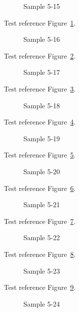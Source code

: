 \begin{figure}[tbhp]
\caption{Sample 5-15}
\label{fig:sample-5-15}
\end{figure}

Test reference Figure~\ref{fig:sample-5-15}.

\begin{figure}[tbhp]
\caption{Sample 5-16}
\label{fig:sample-5-16}
\end{figure}

Test reference Figure~\ref{fig:sample-5-16}.

\begin{figure}[tbhp]
\caption{Sample 5-17}
\label{fig:sample-5-17}
\end{figure}

Test reference Figure~\ref{fig:sample-5-17}.

\begin{figure}[tbhp]
\caption{Sample 5-18}
\label{fig:sample-5-18}
\end{figure}

Test reference Figure~\ref{fig:sample-5-18}.

\begin{figure}[tbhp]
\caption{Sample 5-19}
\label{fig:sample-5-19}
\end{figure}

Test reference Figure~\ref{fig:sample-5-19}.

\begin{figure}[tbhp]
\caption{Sample 5-20}
\label{fig:sample-5-20}
\end{figure}

Test reference Figure~\ref{fig:sample-5-20}.

\begin{figure}[tbhp]
\caption{Sample 5-21}
\label{fig:sample-5-21}
\end{figure}

Test reference Figure~\ref{fig:sample-5-21}.

\begin{figure}[tbhp]
\caption{Sample 5-22}
\label{fig:sample-5-22}
\end{figure}

Test reference Figure~\ref{fig:sample-5-22}.

\begin{figure}[tbhp]
\caption{Sample 5-23}
\label{fig:sample-5-23}
\end{figure}

Test reference Figure~\ref{fig:sample-5-23}.

\begin{figure}[tbhp]
\caption{Sample 5-24}
\label{fig:sample-5-24}
\end{figure}

